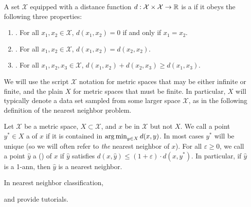 \documentclass[thesis.tex]{subfiles}
\newcommand{\set}[1]{\mathcal {#1}}
\newcommand{\dist}[2]{\distf({#1},{#2})}
\newcommand{\distf}{d}
\begin{document}
A set $\set X$ equipped with a distance function $\distf : \set X \times \set X \to \R$ is a  if it obeys the following three properties:
\begin{enumerate}
    \item {}.  For all $x_1,x_2\in\set X$, $\dist{x_1}{x_2} = 0$ if and only if $x_1=x_2$.
    \item {}. For all $x_1,x_2\in\set X$, $\dist{x_1}{x_2} = \dist{x_2}{x_2}$.
    \item {}.  For all $x_1,x_2,x_3\in\set X$, $\dist{x_1}{x_2} + \dist{x_2}{x_3}\ge\dist{x_1}{x_3}$.
\end{enumerate}
We will use the script $\set X$ notation for metric spaces that may be either infinite or finite,
and the plain $X$ for metric spaces that must be finite.
In particular, $X$ will typically denote a data set sampled from some larger space $\set X$,
as in the following definition of the nearest neighbor problem.

Let $\set X$ be a metric space, $X\subset\set X$, and $x$ be in $\set X$ but not $X$.
We call a point $y^*\in X$ a  of $x$ if it is contained in $\argmin_{y\in X} \dist{x}{y}$.
In most cases $y^*$ will be unique 
(so we will often refer to \textit{the} nearest neighbor of $x$).
For all $\varepsilon \ge 0$,
we call a point $\hat y$ a  () of $x$ if $\hat y$ satisfies $\dist{x}{\hat y} \le (1+\varepsilon) \cdot\dist{x}{y^*}$.
In particular, if $\hat y$ is a 1-ann, then $\hat y$ is a nearest neighbor.


In nearest neighbor classification,

\cite{kulis2013metric} and \cite{bellet2013survey} provide tutorials.
\end{document}
